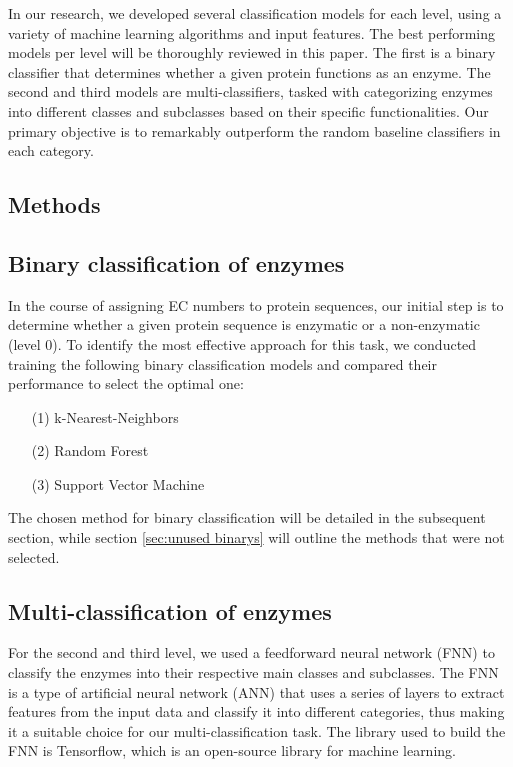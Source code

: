 \documentclass{bioinfo}
\begin{document}
In our research, we developed several classification models for each level, using a variety of machine learning algorithms and input features.
The best performing models per level will be thoroughly reviewed in this paper.
The first is a binary classifier that determines whether a given protein functions as an enzyme. 
The second and third models are  multi-classifiers, tasked with categorizing enzymes into different classes and subclasses 
based on their specific functionalities. 
Our primary objective is to remarkably outperform the random baseline classifiers in each category.

\begin{methods}
\section{Methods}
\subsection{Binary classification of enzymes}
In the course of assigning EC numbers to protein sequences,
our initial step is to determine whether a given protein sequence is enzymatic or a non-enzymatic (level 0).
To identify the most effective approach for this task,
we conducted training the following binary classification models and compared their performance to select the optimal one:
\begin{enumerate}
	\item[(1)] k-Nearest-Neighbors
	\item[(2)] Random Forest 
	\item[(3)] Support Vector Machine
\end{enumerate}

The chosen method for binary classification will be detailed in the subsequent section, while section \ref{sec:unused binarys} will outline the methods that were not selected.


\subsection{Multi-classification of enzymes}
For the second and third level, we used a feedforward neural network (FNN) to classify the enzymes into their respective main classes and subclasses.
The FNN is a type of artificial neural network (ANN) that uses a series of layers to extract features from the input data and classify it into different categories,
thus making it a suitable choice for our multi-classification task. The library used to build the FNN is Tensorflow, which is an open-source library for machine learning.


\end{methods}
\end{document}
